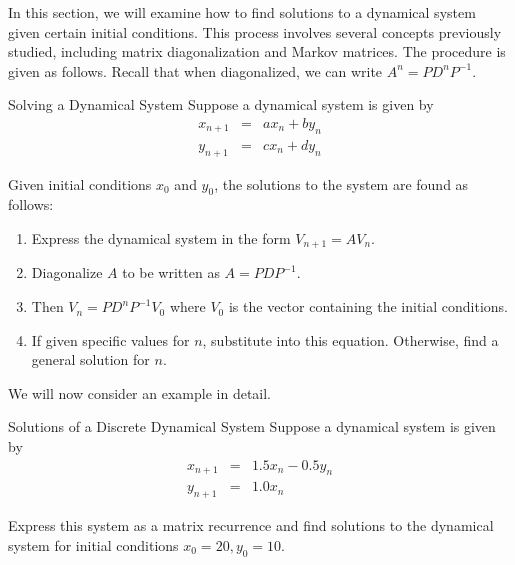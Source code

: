 In this section, we will examine how to find solutions to a dynamical system given certain initial conditions. This process involves several concepts previously studied, including matrix diagonalization and Markov matrices. The procedure is given as follows. Recall that when diagonalized, we can write $A^{n} = PD^{n}P^{-1}$. 

\begin{procedure}{Solving a Dynamical System}\label{proc:solvingdynamical}
Suppose a dynamical system is given by  
\begin{eqnarray*}
x_{n+1} &=& a x_n + b y_n \\
y_{n+1} &=& c x_n + d y_n
\end{eqnarray*}

Given initial conditions $x_0$ and $y_0$, the solutions to the system are found as follows:
\begin{enumerate}
\item
Express the dynamical system in the form $V_{n+1} = AV_n$.
\item
Diagonalize $A$ to be written as $A = PDP^{-1}$.
\item 
Then $V_{n} = PD^{n} P^{-1} V_{0}$ where $V_{0}$ is the vector containing the initial conditions. 
\item
If given specific values for $n$, substitute into this equation. Otherwise, find a general solution for $n$.
\end{enumerate}
\end{procedure}

We will now consider an example in detail.

\begin{example}{Solutions of a Discrete Dynamical System}\label{exa:solutionsdynamicalsystem}
Suppose a dynamical system is given by 
\begin{eqnarray*}
x_{n+1} &=& 1.5 x_n - 0.5y_n\\
y_{n+1} &=& 1.0 x_n
\end{eqnarray*}

Express this system as a matrix recurrence and find solutions to the dynamical system for initial conditions $x_0=20, y_0=10$. 
\end{example}

